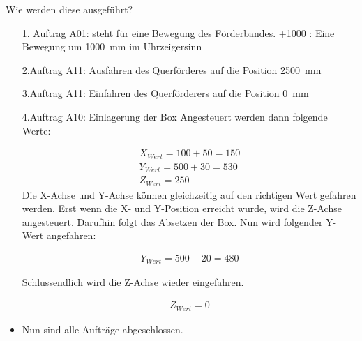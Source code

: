     Wie werden diese ausgeführt? \\

        \begin{itemize}
            \item[1. Auftrag] A01: steht für eine Bewegung des Förderbandes. 
                \subitem +1000 : Eine Bewegung um \qty{1000}{\milli\meter} im Uhrzeigersinn
            \item[2.Auftrag] A11: Ausfahren des Querförderes auf die Position \qty{2500}{\milli\meter} 
            \item[3.Auftrag] A11: Einfahren des Querförderers auf die Position \qty{0}{\milli\meter}
            \item[4.Auftrag] A10: Einlagerung der Box
                \subitem Angesteuert werden dann folgende Werte:

                \vspace{-6mm}
                    \begin{equation*}
                        \begin{split}
                            X_{Wert} = 100 + 50 = 150 \\
                            Y_{Wert} = 500 + 30 = 530 \\
                            Z_{Wert} = 250
                        \end{split}
                    \end{equation*}
                \subitem Die X-Achse und Y-Achse können gleichzeitig auf den   richtigen Wert gefahren werden. Erst wenn die X- und Y-Position erreicht wurde, wird die Z-Achse angesteuert. 
                \subitem Darufhin folgt das Absetzen der Box. Nun wird folgender Y-Wert angefahren:

                \vspace{-6mm}
                    \begin{equation*}
                        \begin{split}
                            Y_{Wert} = 500 - 20 = 480
                        \end{split}
                    \end{equation*}

                \subitem Schlussendlich wird die Z-Achse wieder eingefahren.

                \vspace{-6mm}
                    \begin{equation*}
                        \begin{split}
                            Z_{Wert} = 0
                        \end{split}
                    \end{equation*}
            \item Nun sind alle Aufträge abgeschlossen.
        \end{itemize}

